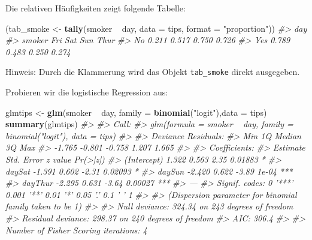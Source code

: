 \documentclass[12pt,ngerman,]{book}
\newenvironment{Shaded}{\begin{snugshade}}{\end{snugshade}}
\newcommand{\KeywordTok}[1]{\textcolor[rgb]{0.13,0.29,0.53}{\textbf{{#1}}}}
\newcommand{\DataTypeTok}[1]{\textcolor[rgb]{0.13,0.29,0.53}{{#1}}}
\newcommand{\StringTok}[1]{\textcolor[rgb]{0.31,0.60,0.02}{{#1}}}
\newcommand{\CommentTok}[1]{\textcolor[rgb]{0.56,0.35,0.01}{\textit{{#1}}}}
\newcommand{\NormalTok}[1]{{#1}}
\renewenvironment{Shaded}{\begin{kframe}}{\end{kframe}}
\begin{document}
Die relativen Häufigkeiten zeigt folgende Tabelle:

\begin{Shaded}
\begin{Highlighting}[]
\NormalTok{(tab_smoke <-}\StringTok{ }\KeywordTok{tally}\NormalTok{(smoker ~}\StringTok{ }\NormalTok{day, }\DataTypeTok{data =} \NormalTok{tips, }\DataTypeTok{format =} \StringTok{"proportion"}\NormalTok{))}
\CommentTok{#>       day}
\CommentTok{#> smoker   Fri   Sat   Sun  Thur}
\CommentTok{#>    No  0.211 0.517 0.750 0.726}
\CommentTok{#>    Yes 0.789 0.483 0.250 0.274}
\end{Highlighting}
\end{Shaded}

Hinweis: Durch die Klammerung wird das Objekt \texttt{tab\_smoke} direkt
ausgegeben.

Probieren wir die logistische Regression aus:

\begin{Shaded}
\begin{Highlighting}[]
\NormalTok{glmtips <-}\StringTok{ }\KeywordTok{glm}\NormalTok{(smoker ~}\StringTok{ }\NormalTok{day, }\DataTypeTok{family =} \KeywordTok{binomial}\NormalTok{(}\StringTok{"logit"}\NormalTok{),}\DataTypeTok{data =} \NormalTok{tips)}
\KeywordTok{summary}\NormalTok{(glmtips)}
\CommentTok{#> }
\CommentTok{#> Call:}
\CommentTok{#> glm(formula = smoker ~ day, family = binomial("logit"), data = tips)}
\CommentTok{#> }
\CommentTok{#> Deviance Residuals: }
\CommentTok{#>    Min      1Q  Median      3Q     Max  }
\CommentTok{#> -1.765  -0.801  -0.758   1.207   1.665  }
\CommentTok{#> }
\CommentTok{#> Coefficients:}
\CommentTok{#>             Estimate Std. Error z value Pr(>|z|)    }
\CommentTok{#> (Intercept)    1.322      0.563    2.35  0.01883 *  }
\CommentTok{#> daySat        -1.391      0.602   -2.31  0.02093 *  }
\CommentTok{#> daySun        -2.420      0.622   -3.89    1e-04 ***}
\CommentTok{#> dayThur       -2.295      0.631   -3.64  0.00027 ***}
\CommentTok{#> ---}
\CommentTok{#> Signif. codes:  0 '***' 0.001 '**' 0.01 '*' 0.05 '.' 0.1 ' ' 1}
\CommentTok{#> }
\CommentTok{#> (Dispersion parameter for binomial family taken to be 1)}
\CommentTok{#> }
\CommentTok{#>     Null deviance: 324.34  on 243  degrees of freedom}
\CommentTok{#> Residual deviance: 298.37  on 240  degrees of freedom}
\CommentTok{#> AIC: 306.4}
\CommentTok{#> }
\CommentTok{#> Number of Fisher Scoring iterations: 4}
\end{Highlighting}
\end{Shaded}
\end{document}
